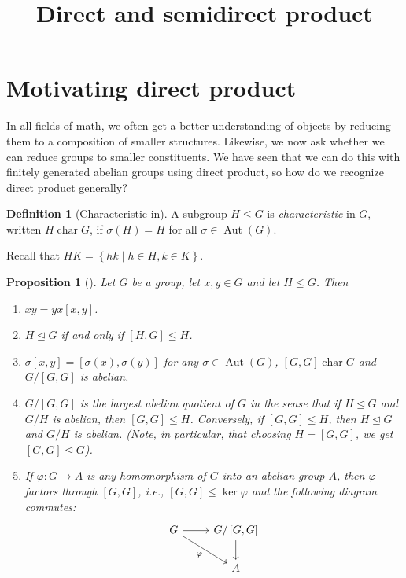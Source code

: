\documentclass[reqno]{amsart}
\title{Direct and semidirect product}
\newtheorem{proposition}[theorem]{Proposition}
\theoremstyle{definition}
\newtheorem{definition}[theorem]{Definition}
\theoremstyle{remark}
\DeclareMathOperator{\Aut}{Aut}
\DeclareMathOperator{\Char}{char}
\begin{document}
\maketitle
\newpage

\section{Motivating direct product}

In all fields of math, we often get a better understanding of objects by
reducing them to a composition of smaller structures. Likewise, we now ask
whether we can reduce groups to smaller constituents. We have seen
that we can do this with finitely generated abelian groups using direct product, so how do we
recognize direct product generally? 

\begin{definition}[Characteristic in]
    A subgroup $H \le G$ is \textit{characteristic} in $G$, written
    $H \Char G$, if  $\sigma(H) = H$ for all 
     $\sigma \in \Aut(G)$.
\end{definition}

 Recall that
$HK = \left\{ hk  \mid h \in H, k \in K \right\} $.

\begin{proposition}[]
    Let $G$ be a group, let $x,y \in G$ and let $H \le G$. Then
    \begin{enumerate}
        \item $xy = yx \left[ x,y \right] $.
        \item $H \trianglelefteq G $ if and only if
            $\left[ H, G \right] \le H$. 
        \item $\sigma \left[ x,y \right] = 
            \left[ \sigma (x), \sigma (y) \right] $ for any 
            $\sigma \in \Aut \left( G \right) $, $\left[ G,G \right]  \Char G$ and
            $G / \left[ G,G \right] $ is abelian.
        \item $G / \left[ G,G \right] $ is the largest abelian quotient
            of $G$ in the sense that if $H \trianglelefteq G$ and $G /H$ is
            abelian, then $\left[ G,G \right] \le H$. Conversely,
            if $\left[ G,G \right] \le H$, then $H \trianglelefteq G$ and
            $G / H$ is abelian. (Note, in particular, that choosing
            $H = \left[ G,G \right] $, we get $\left[ G,G \right]
            \trianglelefteq 
            G$).
        \item If $\varphi \colon G \to A$ is any homomorphism of $G$ into an
            abelian group $A$, then $\varphi $ factors through $\left[ G,G \right] $, i.e.,
            $\left[ G,G \right]  \le \ker \varphi$ and the following diagram commutes:
            \begin{equation*}
            \begin{tikzcd}
                G \ar[r] \ar[dr, "\varphi"'] & G / \left[ G,G \right]  \ar[d]\\
                                     & A
            \end{tikzcd}
            \end{equation*}
    \end{enumerate}
\end{proposition}
\end{document}
